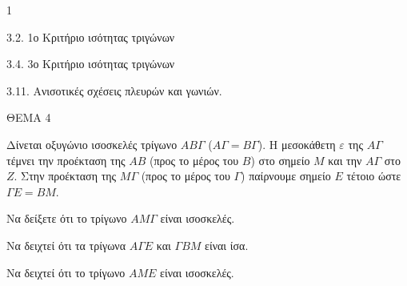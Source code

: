 \begin{ylh}{1}
    \item 3.2. 1ο Κριτήριο ισότητας τριγώνων
    \item 3.4. 3ο Κριτήριο ισότητας τριγώνων
    \item 3.11. Ανισοτικές σχέσεις πλευρών και γωνιών.
\end{ylh}

ΘΕΜΑ 4

Δίνεται οξυγώνιο ισοσκελές τρίγωνο $ΑΒ\Gamma$ ($A\Gamma = B\Gamma$). Η μεσοκάθετη $\varepsilon$ της $A\Gamma$ τέμνει την προέκταση της $AB$ (προς το μέρος του $B$) στο σημείο $M$ και την $A\Gamma$ στο $Z$. Στην προέκταση της $M\Gamma$ (προς το μέρος του $\Gamma$) παίρνουμε σημείο $E$ τέτοιο ώστε $\Gamma E = BM$.

\begin{alist}
\item Να δείξετε ότι το τρίγωνο $AM\Gamma$ είναι ισοσκελές. 
\item Να δειχτεί ότι τα τρίγωνα $A\Gamma E$ και $\Gamma BM$ είναι ίσα. 
\item Να δειχτεί ότι το τρίγωνο $AME$ είναι ισοσκελές. 

\begin{center}
\end{center}
\end{alist}
